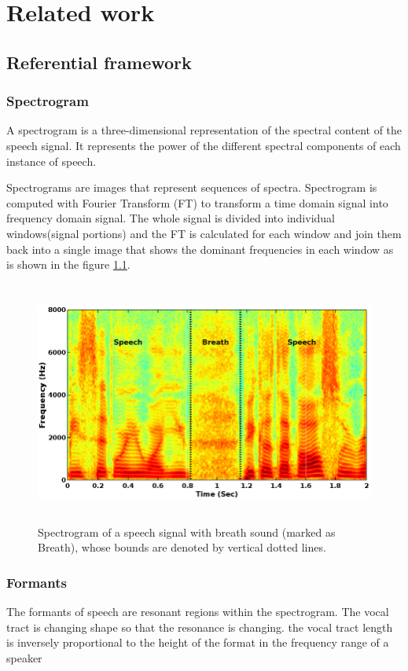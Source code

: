 \chapter{Related work}

\section{Referential framework}

\subsection{Spectrogram}
A spectrogram is a three-dimensional representation of the spectral content of the speech signal. It represents the power of the different spectral components of each instance of speech.

Spectrograms are images that represent sequences of spectra. Spectrogram is computed with Fourier Transform (FT) to transform a time domain signal into frequency domain signal. The whole signal is divided into individual windows(signal portions) and the FT is calculated for each window and join them back into a single image that shows the dominant frequencies in
each window \cite{sribhashyam2021pattern, wyse2017audio} as is shown in the figure \ref{fig:spectrogram}.

\begin{figure}
    \centering
    \includegraphics[height=8cm]{figures/spectogram.png}
    \caption{Spectrogram of a speech signal with breath sound (marked as Breath), whose bounds are denoted by vertical dotted lines.}
    \label{fig:spectrogram}
\end{figure}


\subsection{Formants}
The formants of speech are resonant regions within the spectrogram. The vocal tract is changing shape so that the resonance is changing. the vocal tract length is inversely proportional to the height of the format in the frequency range of a speaker

